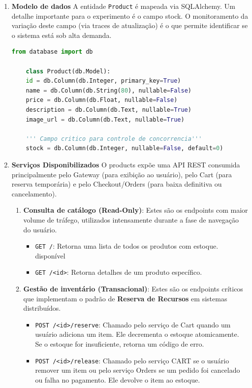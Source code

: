 \begin{enumerate}
    \item \textbf{Modelo de dados} A entidade \texttt{Product} é mapeada via SQLAlchemy. Um detalhe importante para o experimento é o campo stock. O monitoramento da variação deste campo (via traces de atualização) é o que permite identificar se o sistema está sob alta demanda.
    \begin{lstlisting}[language=Python, caption={Modelo de dados dos produtos}, label={lst:pyex}]
    from database import db

    class Product(db.Model):
    id = db.Column(db.Integer, primary_key=True)
    name = db.Column(db.String(80), nullable=False)
    price = db.Column(db.Float, nullable=False)
    description = db.Column(db.Text, nullable=True)
    image_url = db.Column(db.Text, nullable=True)
    
    ''' Campo critico para controle de concorrencia'''
    stock = db.Column(db.Integer, nullable=False, default=0)
    \end{lstlisting}
    \item \textbf{Serviços Disponibilizados} O products expõe uma API REST consumida principalmente pelo Gateway (para exibição ao usuário), pelo Cart (para reserva temporária) e pelo Checkout/Orders (para baixa definitiva ou cancelamento).
    \begin{enumerate}
        \item \textbf{Consulta de catálogo (Read-Only)}: Estes são os endpoints com maior volume de tráfego, utilizados intensamente durante a fase de navegação do usuário.
        \begin{itemize}
            \item \texttt{GET /}: Retorna uma lista de todos os produtos com estoque. disponível
            \item \texttt{GET /<id>}: Retorna detalhes de um produto específico.
        \end{itemize}
    \item \textbf{Gestão de inventário (Transacional)}: Estes são os endpoints críticos que implementam o padrão de \textbf{Reserva de Recursos} em sistemas distribuídos.
        \begin{itemize}
            \item \texttt{POST /<id>/reserve}: Chamado pelo serviço de Cart quando um usuário adiciona um item. Ele decrementa o estoque atomicamente. Se o estoque for insuficiente, retorna um código de erro.
            \item \texttt{POST /<id>/release}: Chamado pelo serviço CART se o usuário remover um item ou pelo serviço Orders se um pedido foi cancelado ou falha no pagamento. Ele devolve o item ao estoque.
        
        \end{itemize}
    \end{enumerate}
\end{enumerate}

